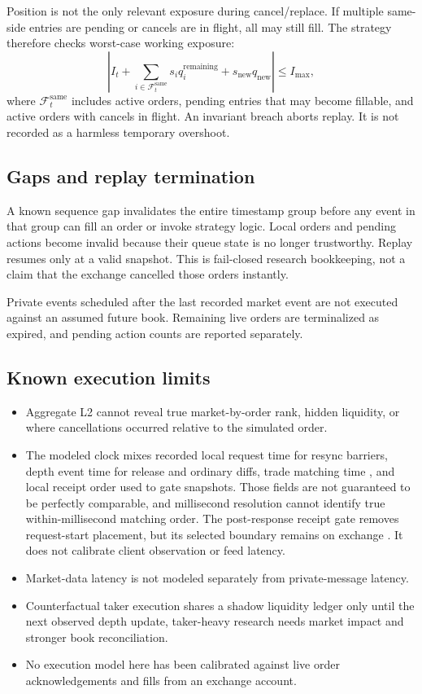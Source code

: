 Position is not the only relevant exposure during cancel/replace. If multiple
same-side entries are pending or cancels are in flight, all may still fill. The
strategy therefore checks worst-case working exposure:
\begin{equation}
  \left|I_t + \sum_{i\in\mathcal{F}_t^{\mathrm{same}}}
  s_i q^{\mathrm{remaining}}_i + s_{\mathrm{new}}q_{\mathrm{new}}\right|
  \le I_{\max},
\end{equation}
where $\mathcal{F}_t^{\mathrm{same}}$ includes active orders, pending entries
that may become fillable, and active orders with cancels in flight. An invariant
breach aborts replay. It is not recorded as a harmless temporary overshoot.

\subsection{Gaps and replay termination}

A known sequence gap invalidates the entire timestamp group before any event in
that group can fill an order or invoke strategy logic. Local orders and pending
actions become invalid because their queue state is no longer trustworthy.
Replay resumes only at a valid snapshot. This is fail-closed research
bookkeeping, not a claim that the exchange cancelled those orders instantly.

Private events scheduled after the last recorded market event are not executed
against an assumed future book. Remaining live orders are terminalized as
expired, and pending action counts are reported separately.

\subsection{Known execution limits}

\begin{itemize}
  \item Aggregate L2 cannot reveal true market-by-order rank, hidden liquidity,
        or where cancellations occurred relative to the simulated order.
  \item The modeled clock mixes recorded local request time for resync barriers,
        depth event time  for release and ordinary diffs, trade matching
        time , and local receipt order used to gate snapshots.
        Those fields are not guaranteed to be perfectly comparable, and
        millisecond resolution cannot identify true within-millisecond matching
        order. The post-response receipt gate removes request-start placement,
        but its selected boundary remains on exchange . It does not
        calibrate client observation or feed latency.
  \item Market-data latency is not modeled separately from private-message
        latency.
  \item Counterfactual taker execution shares a shadow liquidity ledger only
        until the next observed depth update, taker-heavy research needs market
        impact and stronger book reconciliation.
  \item No execution model here has been calibrated against live order
        acknowledgements and fills from an exchange account.
\end{itemize}
